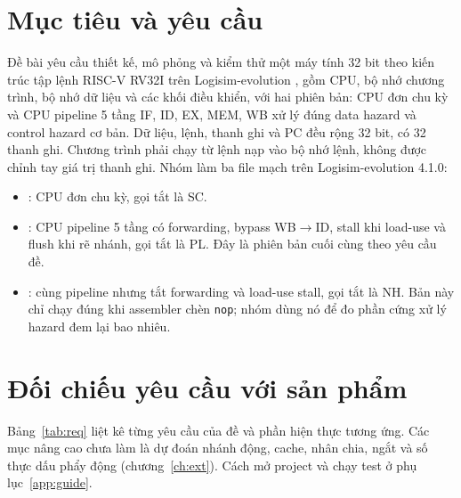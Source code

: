 \documentclass[../report.tex]{subfiles}
\begin{document}
\section{Mục tiêu và yêu cầu}

Đề bài yêu cầu thiết kế, mô phỏng và kiểm thử một máy tính 32 bit theo kiến trúc tập lệnh RISC-V RV32I
\cite{riscv-spec} trên Logisim-evolution \cite{logisim}, gồm CPU, bộ nhớ chương trình, bộ nhớ dữ liệu và các khối
điều khiển, với hai phiên bản: CPU đơn chu kỳ và CPU pipeline 5 tầng IF, ID, EX, MEM, WB xử lý đúng data hazard và
control hazard cơ bản. Dữ liệu, lệnh, thanh ghi và PC đều rộng 32 bit, có 32 thanh ghi. Chương trình phải chạy từ
lệnh nạp vào bộ nhớ lệnh, không được chỉnh tay giá trị thanh ghi. Nhóm làm ba file mạch trên Logisim-evolution 4.1.0:

\begin{itemize}
  \item {}: CPU đơn chu kỳ, gọi tắt là SC.
  \item {}: CPU pipeline 5 tầng có forwarding, bypass WB$\to$ID, stall khi load-use
        và flush khi rẽ nhánh, gọi tắt là PL. Đây là phiên bản cuối cùng theo yêu cầu đề.
  \item {}: cùng pipeline nhưng tắt forwarding và load-use stall,
        gọi tắt là NH. Bản này chỉ chạy đúng khi assembler chèn \texttt{nop}; nhóm dùng nó để đo phần cứng xử lý
        hazard đem lại bao nhiêu.
\end{itemize}

\section{Đối chiếu yêu cầu với sản phẩm}

Bảng~\ref{tab:req} liệt kê từng yêu cầu của đề và phần hiện thực tương ứng. Các mục nâng cao chưa làm là dự đoán
nhánh động, cache, nhân chia, ngắt và số thực dấu phẩy động (chương~\ref{ch:ext}). Cách mở project và chạy test ở
phụ lục~\ref{app:guide}.
\end{document}
